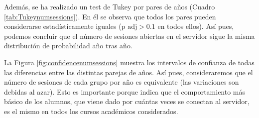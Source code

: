 Además, se ha realizado un test de Tukey por pares de años (Cuadro \ref{tab:Tukeynumsessions}). En él se observa que todos los pares pueden considerarse estadísticamente iguales ($\text{p adj} > 0.1$ en todos ellos). Así pues, podemos concluir que el número de sesiones abiertas en el servidor sigue la misma distribución de probabilidad año tras año.

La Figura \ref{fig:confidencenumsessions} muestra los intervalos de confianza de todas las diferencias entre las distintas parejas de años. Así pues, consideraremos que el número de sesiones de cada grupo por año es equivalente (las variaciones son debidas al azar). Esto es importante porque indica que el comportamiento más básico de los alumnos, que viene dado por cuántas veces se conectan al servidor, es el mismo en todos los cursos académicos considerados.

